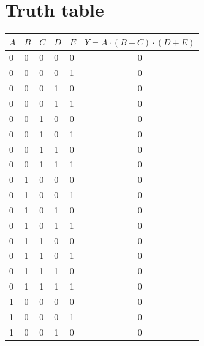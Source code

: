 \documentclass[11pt]{article}
\begin{document}
\section{Truth table}
\begin{table}[!h]
    \centering
    \begin{tabular}{|l|l|l|l|l|c|}
        \hline
        $A$ & $B$ & $C$ & $D$ & $E$ & $Y=A\cdot(B+C)\cdot(D+E)$ \\ \hline
        0   & 0   & 0   & 0   & 0   & 0                         \\ \hline
        0   & 0   & 0   & 0   & 1   & 0                         \\ \hline
        0   & 0   & 0   & 1   & 0   & 0                         \\ \hline
        0   & 0   & 0   & 1   & 1   & 0                         \\ \hline
        0   & 0   & 1   & 0   & 0   & 0                         \\ \hline
        0   & 0   & 1   & 0   & 1   & 0                         \\ \hline
        0   & 0   & 1   & 1   & 0   & 0                         \\ \hline
        0   & 0   & 1   & 1   & 1   & 0                         \\ \hline
        0   & 1   & 0   & 0   & 0   & 0                         \\ \hline
        0   & 1   & 0   & 0   & 1   & 0                         \\ \hline
        0   & 1   & 0   & 1   & 0   & 0                         \\ \hline
        0   & 1   & 0   & 1   & 1   & 0                         \\ \hline
        0   & 1   & 1   & 0   & 0   & 0                         \\ \hline
        0   & 1   & 1   & 0   & 1   & 0                         \\ \hline
        0   & 1   & 1   & 1   & 0   & 0                         \\ \hline
        0   & 1   & 1   & 1   & 1   & 0                         \\ \hline
        1   & 0   & 0   & 0   & 0   & 0                         \\ \hline
        1   & 0   & 0   & 0   & 1   & 0                         \\ \hline
        1   & 0   & 0   & 1   & 0   & 0                         \\ \hline

\end{tabular}
\end{table}
\end{document}
